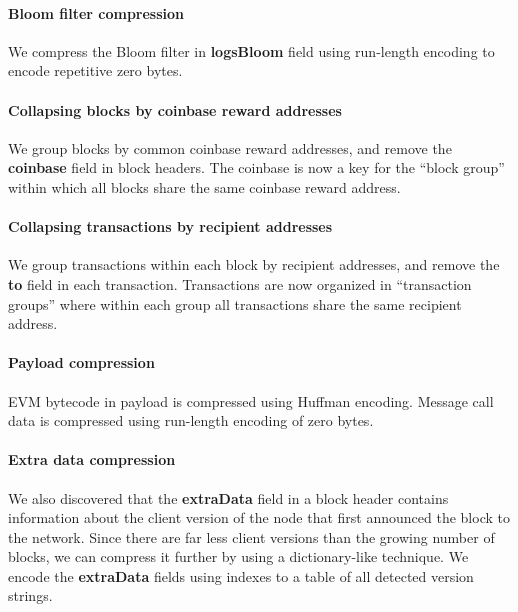 \paragraph{Bloom filter compression} We compress the Bloom filter in \textbf{logsBloom} field using run-length
encoding to encode repetitive zero bytes.

\paragraph{Collapsing blocks by coinbase reward addresses} We group blocks by common coinbase reward addresses, and remove
the \textbf{coinbase} field in block headers. The coinbase is now a key for the ``block group'' within which all blocks
share the same coinbase reward address.

\paragraph{Collapsing transactions by recipient addresses} We group transactions within each block by recipient addresses, and
remove the \textbf{to} field in each transaction. Transactions are now organized in ``transaction groups'' where within
each group all transactions share the same recipient address.

\paragraph{Payload compression} EVM bytecode in payload is compressed using Huffman encoding. Message call data is compressed
using run-length encoding of zero bytes.

\paragraph{Extra data compression} We also discovered that the \textbf{extraData} field in a block header contains information
about the client version of the node that first announced the block to the network. Since there are far less client versions
than the growing number of blocks, we can compress it further by using a dictionary-like technique. We encode the
\textbf{extraData} fields using indexes to a table of all detected version strings.

